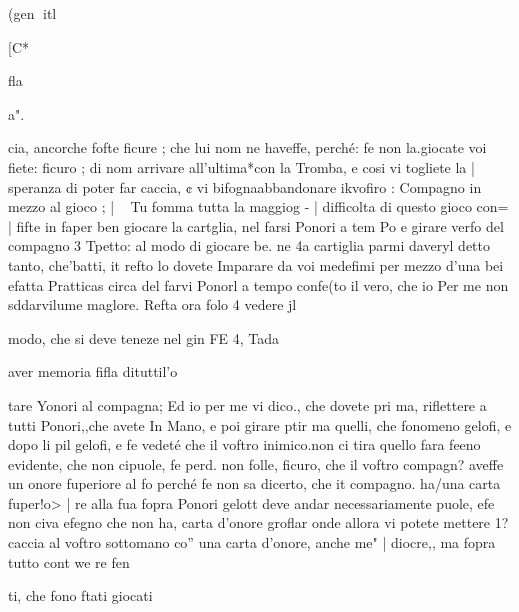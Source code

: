 \documentclass[12pt,a6paper]{article}
\begin{document}
 

 

 

 

 

 

 

 

 

 

 

(gen
itl

[C*

fla

a".

cia, ancorche fofte ficure ; che
lui nom ne haveffe, perché: fe
non la.giocate voi fiete: ficuro ;
di nom arrivare all’ultima*con
la Tromba, e cosi vi togliete la |
speranza di poter far caccia, ¢
vi bifognaabbandonare ikvofiro :
Compagno in mezzo al gioco ; |
~ Tu fomma tutta la maggiog - |
difficolta di questo gioco con= |
fifte in faper ben giocare la cartglia, nel farsi Ponori a tem Po
e girare verfo del compagno 3
Tpetto: al modo di giocare be.
ne 4a cartiglia parmi daveryl
detto tanto, che'batti, it refto lo
dovete Imparare da voi medefimi per mezzo d’una bei efatta
Pratticas circa del farvi Ponorl
a tempo confe(to il vero, che io
Per me non sddarvilume maglore. Refta ora folo 4 vedere jl

modo, che si deve teneze nel gin
FE 4, Tada

 

 
 

 

 

 

aver memoria fifla dituttil’o

 

tare Yonori al compagna; Ed io
per me vi dico., che dovete pri
ma, riflettere a tutti Ponori,,che
avete In Mano, e poi girare ptir
ma quelli, che fonomeno gelofi,
e dopo li pil gelofi, e fe vedeté
che il voftro inimico.non ci tira
quello fara feeno evidente, che
non cipuole, fe perd. non folle,
ficuro, che il voftro compagn?
aveffe un onore fuperiore al fo
perché fe non sa dicerto, che it
compagno. ha/una carta fuper!o> |
re alla fua fopra Ponori gelott
deve andar necessariamente
puole, efe non civa efegno
che non ha, carta d’onore groflar
onde allora vi potete mettere 1?
caccia al voftro sottomano co”
una carta d’onore, anche me" |
diocre,, ma fopra tutto cont
we re
fen

 

ti, che fono ftati giocati
\end{document}
